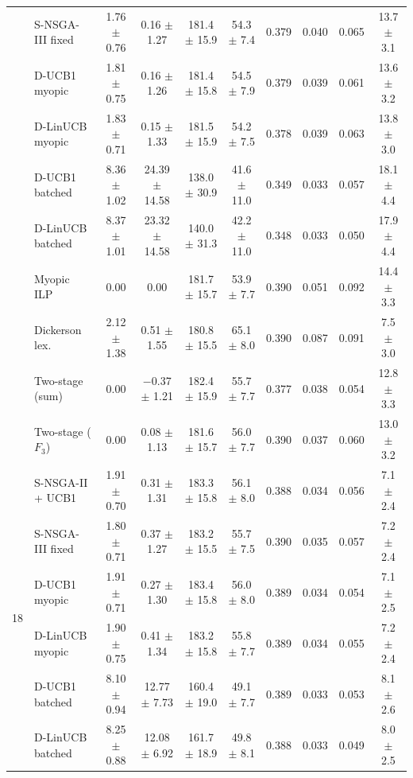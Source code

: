 \documentclass[journal]{IEEEtran}
\begin{document}
\begin{table}[!t]
\begin{tabular}{@{}cl cccccccc@{}}
 & S-NSGA-III fixed   & 1.76 $\pm$ 0.76 & 0.16 $\pm$ 1.27   & 181.4 $\pm$ 15.9 & 54.3 $\pm$ 7.4 & 0.379 & 0.040 & 0.065 & 13.7 $\pm$ 3.1 \\
 & D-UCB1 myopic      & 1.81 $\pm$ 0.75 & 0.16 $\pm$ 1.26   & 181.4 $\pm$ 15.8 & 54.5 $\pm$ 7.9 & 0.379 & 0.039 & 0.061 & 13.6 $\pm$ 3.2 \\
 & D-LinUCB myopic    & 1.83 $\pm$ 0.71 & 0.15 $\pm$ 1.33   & 181.5 $\pm$ 15.9 & 54.2 $\pm$ 7.5 & 0.378 & 0.039 & 0.063 & 13.8 $\pm$ 3.0 \\
 & D-UCB1 batched     & 8.36 $\pm$ 1.02 & 24.39 $\pm$ 14.58 & 138.0 $\pm$ 30.9 & 41.6 $\pm$ 11.0 & 0.349 & 0.033 & 0.057 & 18.1 $\pm$ 4.4 \\
 & D-LinUCB batched   & 8.37 $\pm$ 1.01 & 23.32 $\pm$ 14.58 & 140.0 $\pm$ 31.3 & 42.2 $\pm$ 11.0 & 0.348 & 0.033 & 0.050 & 17.9 $\pm$ 4.4 \\
 & Myopic ILP         & 0.00            & 0.00              & 181.7 $\pm$ 15.7 & 53.9 $\pm$ 7.7 & 0.390 & 0.051 & 0.092 & 14.4 $\pm$ 3.3 \\
 & Dickerson lex.     & 2.12 $\pm$ 1.38 & 0.51 $\pm$ 1.55   & 180.8 $\pm$ 15.5 & 65.1 $\pm$ 8.0 & 0.390 & 0.087 & 0.091 & 7.5 $\pm$ 3.0 \\
 & Two-stage (sum)    & 0.00            & $-$0.37 $\pm$ 1.21 & 182.4 $\pm$ 15.9 & 55.7 $\pm$ 7.7 & 0.377 & 0.038 & 0.054 & 12.8 $\pm$ 3.3 \\
 & Two-stage ($F_3$)  & 0.00            & 0.08 $\pm$ 1.13   & 181.6 $\pm$ 15.7 & 56.0 $\pm$ 7.7 & 0.390 & 0.037 & 0.060 & 13.0 $\pm$ 3.2 \\
\midrule
\multirow{10}{*}{18}
 & S-NSGA-II + UCB1   & 1.91 $\pm$ 0.70 & 0.31 $\pm$ 1.31   & 183.3 $\pm$ 15.8 & 56.1 $\pm$ 8.0 & 0.388 & 0.034 & 0.056 & 7.1 $\pm$ 2.4 \\
 & S-NSGA-III fixed   & 1.80 $\pm$ 0.71 & 0.37 $\pm$ 1.27   & 183.2 $\pm$ 15.5 & 55.7 $\pm$ 7.5 & 0.390 & 0.035 & 0.057 & 7.2 $\pm$ 2.4 \\
 & D-UCB1 myopic      & 1.91 $\pm$ 0.71 & 0.27 $\pm$ 1.30   & 183.4 $\pm$ 15.8 & 56.0 $\pm$ 8.0 & 0.389 & 0.034 & 0.054 & 7.1 $\pm$ 2.5 \\
 & D-LinUCB myopic    & 1.90 $\pm$ 0.75 & 0.41 $\pm$ 1.34   & 183.2 $\pm$ 15.8 & 55.8 $\pm$ 7.7 & 0.389 & 0.034 & 0.055 & 7.2 $\pm$ 2.4 \\
 & D-UCB1 batched     & 8.10 $\pm$ 0.94 & 12.77 $\pm$ 7.73  & 160.4 $\pm$ 19.0 & 49.1 $\pm$ 7.7 & 0.389 & 0.033 & 0.053 & 8.1 $\pm$ 2.6 \\
 & D-LinUCB batched   & 8.25 $\pm$ 0.88 & 12.08 $\pm$ 6.92  & 161.7 $\pm$ 18.9 & 49.8 $\pm$ 8.1 & 0.388 & 0.033 & 0.049 & 8.0 $\pm$ 2.5 \\

\end{tabular}
\end{table}
\end{document}
